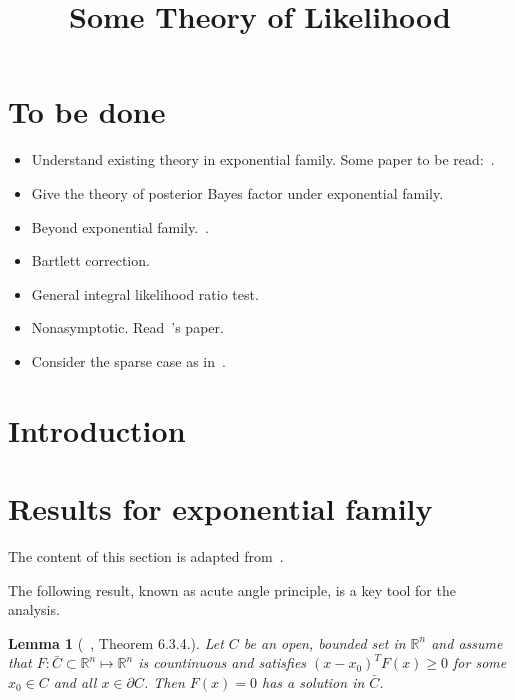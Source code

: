 \documentclass[11pt, letterpaper]{article}
\theoremstyle{plain}
\newtheorem{lemma}{\quad\quad Lemma}
\theoremstyle{definition}
\theoremstyle{remark}
\begin{document}
\title{Some Theory of Likelihood}
\maketitle
\section{To be done}
\begin{itemize}
    \item
        {\color{red} Understand existing theory in exponential family. 
        Some paper to be read:~\citet{portnoy1988asymptotic,Ghosal2000Asymptotic}.}
    \item
        Give the theory of posterior Bayes factor under exponential family.
    \item
        Beyond exponential family.~\citep{berger2003approximatios}.
    \item
        Bartlett correction.
    \item
    General integral likelihood ratio test.
    \item
        Nonasymptotic. Read~\cite{spokoiny2012parametric}'s paper.
    \item
    Consider the sparse case as in~\cite{stadler2016two}.
\end{itemize}
\section{Introduction}

\section{Results for exponential family}
The content of this section is adapted from~\cite{Ghosal2000Asymptotic}.

The following result, known as acute angle principle, is a key tool for the analysis.
\begin{lemma}[~\cite{book:263774}, Theorem 6.3.4.]\label{acute}
    Let $C$ be an open, bounded set in $\mathbb{R}^n$ and assume that $F:\bar{C}\subset \mathbb{R}^n \mapsto \mathbb{R}^n$ is countinuous and satisfies $(x-x_0)^T F(x)\geq 0$ for some $x_0\in C$ and all $x\in \partial C$. Then $F(x)=0$ has a solution in $\bar{C}$.
\end{lemma}
\end{document}
